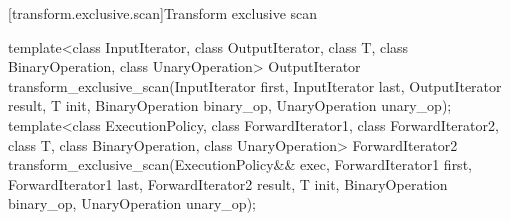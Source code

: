 [transform.exclusive.scan]{Transform exclusive scan}

%
\begin{itemdecl}
template<class InputIterator, class OutputIterator, class T,
         class BinaryOperation, class UnaryOperation>
  OutputIterator transform_exclusive_scan(InputIterator first, InputIterator last,
                                          OutputIterator result,
                                          T init,
                                          BinaryOperation binary_op,
                                          UnaryOperation unary_op);
template<class ExecutionPolicy,
         class ForwardIterator1, class ForwardIterator2, class T,
         class BinaryOperation, class UnaryOperation>
  ForwardIterator2 transform_exclusive_scan(ExecutionPolicy&& exec,
                                            ForwardIterator1 first, ForwardIterator1 last,
                                            ForwardIterator2 result,
                                            T init,
                                            BinaryOperation binary_op,
                                            UnaryOperation unary_op);
\end{itemdecl}


